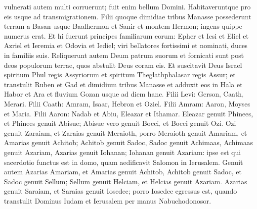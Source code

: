 \begin{biblechapter}
\verse vulnerati autem multi corruerunt; fuit enim bellum Domini. Habitaveruntque pro eis usque ad transmigrationem. 
\verse Filii quoque dimidiae tribus Manasse possederunt terram a Basan usque Baalhermon et Sanir et montem Hermon; ingens quippe numerus erat. 
\verse Et hi fuerunt principes familiarum eorum: Epher et Iesi et Eliel et Azriel et Ieremia et Odovia et Iediel; viri bellatores fortissimi et nominati, duces in familiis suis. 
\verse Reliquerunt autem Deum patrum suorum et fornicati sunt post deos populorum terrae, quos abstulit Deus coram eis. 
\verse Et suscitavit Deus Israel spiritum Phul regis Assyriorum et spiritum Theglathphalasar regis Assur; et transtulit Ruben et Gad et dimidium tribus Manasse et adduxit eos in Hala et Habor et Ara et fluvium Gozan usque ad diem hanc. 
\verse Filii Levi: Gerson, Caath, Merari. 
\verse Filii Caath: Amram, Isaar, Hebron et Oziel. 
\verse Filii Amram: Aaron, Moyses et Maria. Filii Aaron: Nadab et Abiu, Eleazar et Ithamar. 
\verse Eleazar genuit Phinees, et Phinees genuit Abisue; 
\verse Abisue vero genuit Bocci, et Bocci genuit Ozi. 
\verse Ozi genuit Zaraiam, et Zaraias genuit Meraioth, 
\verse porro Meraioth genuit Amariam, et Amarias genuit Achitob; 
\verse Achitob genuit Sadoc, Sadoc genuit Achimaas,  
\verse Achimaas genuit Azariam, Azarias genuit Iohanan; 
\verse Iohanan genuit Azariam: ipse est qui sacerdotio functus est in domo, quam aedificavit Salomon in Ierusalem. 
\verse Genuit autem Azarias Amariam, et Amarias genuit Achitob,  
\verse Achitob genuit Sadoc, et Sadoc genuit Sellum; 
\verse Sellum genuit Helciam, et Helcias genuit Azariam. 
\verse Azarias genuit Saraiam, et Saraias genuit Iosedec; 
\verse porro Iosedec egressus est, quando transtulit Dominus Iudam et Ierusalem per manus Nabuchodonosor. 
\end{biblechapter}

